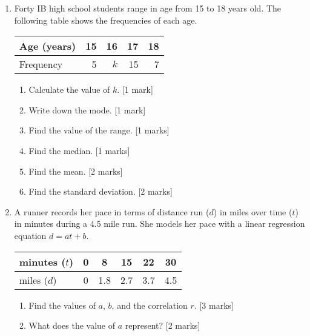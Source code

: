 \documentclass[12pt, twoside]{article}
\begin{document}
\begin{enumerate}
\newpage
    \item Forty IB high school students range in age from 15 to 18 years old. The following table shows the frequencies of each age.
        \begin{center}
            \begin{tabular}{|l|r|r|r|r|}
                \hline
                Age (years) & 15 & 16 & 17 & 18\\ 
                \hline 
                Frequency & 5 & $k$ & 15 & 7\\ 
                \hline 
                \end{tabular}      
        \end{center}
        \begin{enumerate}[itemsep=1cm]
            \item Calculate the value of $k$. \hfill [1 mark]
            \item Write down the mode. \hfill [1 mark]
            \item Find the value of the range. \hfill [1 marks]
            \item Find the median. \hfill [1 marks]
            \item Find the mean. \hfill [2 marks]
            \item Find the standard deviation. \hfill [2 marks]
        \end{enumerate} \vspace{1cm}

    \item A runner records her pace in terms of distance run ($d$) in miles over time ($t$) in minutes during a 4.5 mile run. She models her pace with a linear regression equation $d=at+b$.
        \begin{center}
        \begin{tabular}{|l|c|c|c|c|c|}
            \hline
            minutes ($t$) & 0 & 8 & 15 & 22 & 30 \\ 
            \hline 
            miles ($d$) & 0 & 1.8 & 2.7 & 3.7 & 4.5 \\ 
            \hline 
            \end{tabular}
        \end{center}
        \begin{enumerate}[itemsep=2.5cm]
            \item Find the values of $a$, $b$, and the correlation $r$. \hfill [3 marks]
            \item What does the value of $a$ represent? \hfill [2 marks]
        \end{enumerate}


\end{enumerate}
\end{document}
